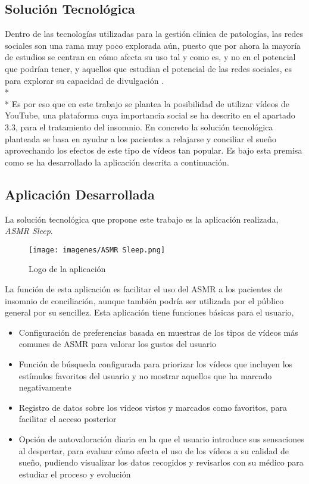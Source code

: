 \documentclass[a4paper,12pt,twoside]{memoir}
\begin{document}
\subsection{Solución Tecnológica}
Dentro de las tecnologías utilizadas para la gestión clínica de patologías, las redes sociales son una rama muy poco explorada aún, puesto que por ahora la mayoría de estudios se centran en cómo afecta su uso tal y como es, y no en el potencial que podrían tener, y aquellos que estudian el potencial de las redes sociales, es para explorar su capacidad de divulgación \cite{diariofarma-2019}.\\*\\* Es por eso que en este trabajo se plantea la posibilidad de utilizar vídeos de YouTube, una plataforma cuya importancia social se ha descrito en el apartado 3.3, para el tratamiento del insomnio. En concreto la solución tecnológica planteada se basa en ayudar a los pacientes a relajarse y conciliar el sueño aprovechando los efectos de este tipo de vídeos tan popular. Es bajo esta premisa como se ha desarrollado la aplicación descrita a continuación.
\subsection{Aplicación Desarrollada}
La solución tecnológica que propone este trabajo es la aplicación realizada, \textit{ASMR Sleep}. \begin{figure}
    \centering
    \texttt{[image: imagenes/ASMR Sleep.png]}
    \caption{Logo de la aplicación}
    \label{fig:enter-label}
\end{figure}
La función de esta aplicación es facilitar el uso del ASMR a los pacientes de insomnio de conciliación, aunque también podría ser utilizada por el público general por su sencillez. Esta aplicación tiene funciones básicas para el usuario,
\begin{itemize}
    \item Configuración de preferencias basada en muestras de los tipos de vídeos más comunes de ASMR para valorar los gustos del usuario
    \item Función de búsqueda configurada para priorizar los vídeos que incluyen los estímulos favoritos del usuario y no mostrar aquellos que ha marcado negativamente
    \item Registro de datos sobre los vídeos vistos y marcados como favoritos, para facilitar el acceso posterior
    \item  Opción de autovaloración diaria en la que el usuario introduce sus sensaciones al despertar, para evaluar cómo afecta el uso de los vídeos a su calidad de sueño, pudiendo visualizar los datos recogidos y revisarlos con su médico para estudiar el proceso y evolución
\end{itemize}
\end{document}
